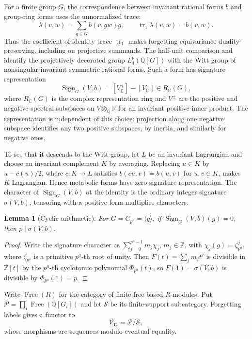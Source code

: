 \documentclass[11pt]{amsart}
\numberwithin{equation}{section}
\newtheorem{lemma}[lemma]{Lemma}
\theoremstyle{definition}
\theoremstyle{remark}
\DeclareMathOperator{\Free}{Free}
\DeclareMathOperator{\Sign}{Sign}
\DeclareMathOperator{\tr}{tr}
\newcommand{\Q}{\mathbb Q}
\newcommand{\Z}{\mathbb Z}
\newcommand{\C}{\mathbb C}
\newcommand{\R}{\mathbb R}
\begin{document}
For a finite group $G$, the correspondence between invariant rational
forms $b$ and group-ring forms uses the unnormalized trace:
\begin{equation}\label{alg:trace}
 \lambda(v,w)=\sum_{g\in G}b(v,gw)g,\qquad \tr_1\lambda(v,w)=b(v,w).
\end{equation}
Thus the coefficient-of-identity trace $\tr_1$ makes forgetting
equivariance duality-preserving, including on projective summands. The half-unit comparison and \cite[Theorem 5.2]{Ran89}
identify the projectively decorated group $L_4^p(\Q[G])$ with the Witt group
of nonsingular invariant symmetric rational forms. Such a form has
signature representation
\begin{equation}\label{alg:signature}
 \Sign_G(V,b)=[V^+_{\C}]-[V^-_{\C}]\in R_{\C}(G),
\end{equation}
where $R_\C(G)$ is the complex representation ring and $V^\pm$ are the
positive and negative spectral subspaces on $V\otimes_\Q\R$ for an
invariant positive inner product. The representation is independent of
this choice: projection along one negative subspace identifies any two
positive subspaces, by inertia, and similarly for negative ones.

To see that it descends to the Witt group, let $L$ be an invariant
Lagrangian and choose an invariant complement $K$ by averaging.
Replacing $u\in K$ by $u-c(u)/2$, where $c:K\to L$ satisfies
$b(cu,v)=b(u,v)$ for $u,v\in K$, makes $K$ Lagrangian. Hence metabolic
forms have zero signature representation. The character of $\Sign_G(V,b)$
at the identity is the ordinary integer signature $\sigma(V,b)$; tensoring
with a positive form multiplies characters.

\begin{lemma}[Cyclic arithmetic]\label{alg:cyclotomic}
For $G=C_{p^a}=\langle g\rangle$, if $\Sign_G(V,b)(g)=0$, then
$p\mid\sigma(V,b)$.
\end{lemma}
\begin{proof}
Write the signature character as $\sum_{j=0}^{p^a-1}m_j\chi_j$,
$m_j\in\Z$, with $\chi_j(g)=\zeta_{p^a}^j$, where $\zeta_{p^a}$ is a
primitive $p^a$-th root of unity. Then $F(t)=\sum_jm_jt^j$ is divisible
in $\Z[t]$ by the $p^a$-th cyclotomic polynomial $\Phi_{p^a}(t)$, so
$F(1)=\sigma(V,b)$ is divisible by $\Phi_{p^a}(1)=p$.
\end{proof}

Write $\Free(R)$ for the category of finite free based $R$-modules.
Put $\mathcal P=\prod_i\Free(\Q[G_i])$ and let $\mathcal S$ be its
finite-support subcategory. Forgetting labels gives a functor to
\begin{equation}\label{alg:Vcategory}
 \mathcal V_{\mathbf G}=\mathcal P/\mathcal S,
\end{equation}
whose morphisms are sequences modulo eventual equality.
\end{document}
